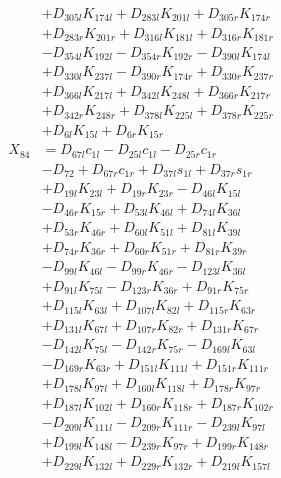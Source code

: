 \begin{multicols}{2}
\begin{align}
&+ D_{305l}K_{174l} + D_{283l}K_{201l} + D_{305r}K_{174r}  \nonumber \\
&+ D_{283r}K_{201r} + D_{316l}K_{181l} + D_{316r}K_{181r}  \nonumber \\
&- D_{354l}K_{192l} - D_{354r}K_{192r} - D_{390l}K_{174l}  \nonumber \\
&+ D_{330l}K_{237l} - D_{390r}K_{174r} + D_{330r}K_{237r}  \nonumber \\
&+ D_{366l}K_{217l} + D_{342l}K_{248l} + D_{366r}K_{217r}  \nonumber \\
&+ D_{342r}K_{248r} + D_{378l}K_{225l} + D_{378r}K_{225r}  \nonumber \\
&+ D_{6l}K_{15l} + D_{6r}K_{15r} \nonumber \\
X_{84} &= D_{67l}c_{1l} - D_{25l}c_{1l} - D_{25r}c_{1r}  \nonumber \\
&- D_{72} + D_{67r}c_{1r} + D_{37l}s_{1l} + D_{37r}s_{1r}  \nonumber \\
&+ D_{19l}K_{23l} + D_{19r}K_{23r} - D_{46l}K_{15l}  \nonumber \\
&- D_{46r}K_{15r} + D_{53l}K_{46l} + D_{74l}K_{36l}  \nonumber \\
&+ D_{53r}K_{46r} + D_{60l}K_{51l} + D_{81l}K_{39l}  \nonumber \\
&+ D_{74r}K_{36r} + D_{60r}K_{51r} + D_{81r}K_{39r}  \nonumber \\
&- D_{99l}K_{46l} - D_{99r}K_{46r} - D_{123l}K_{36l}  \nonumber \\
&+ D_{91l}K_{75l} - D_{123r}K_{36r} + D_{91r}K_{75r}  \nonumber \\
&+ D_{115l}K_{63l} + D_{107l}K_{82l} + D_{115r}K_{63r}  \nonumber \\
&+ D_{131l}K_{67l} + D_{107r}K_{82r} + D_{131r}K_{67r}  \nonumber \\
&- D_{142l}K_{75l} - D_{142r}K_{75r} - D_{169l}K_{63l}  \nonumber \\
&- D_{169r}K_{63r} + D_{151l}K_{111l} + D_{151r}K_{111r}  \nonumber \\
&+ D_{178l}K_{97l} + D_{160l}K_{118l} + D_{178r}K_{97r}  \nonumber \\
&+ D_{187l}K_{102l} + D_{160r}K_{118r} + D_{187r}K_{102r}  \nonumber \\
&- D_{209l}K_{111l} - D_{209r}K_{111r} - D_{239l}K_{97l}  \nonumber \\
&+ D_{199l}K_{148l} - D_{239r}K_{97r} + D_{199r}K_{148r}  \nonumber \\
&+ D_{229l}K_{132l} + D_{229r}K_{132r} + D_{219l}K_{157l}  \nonumber \\

\end{align}
\end{multicols}
